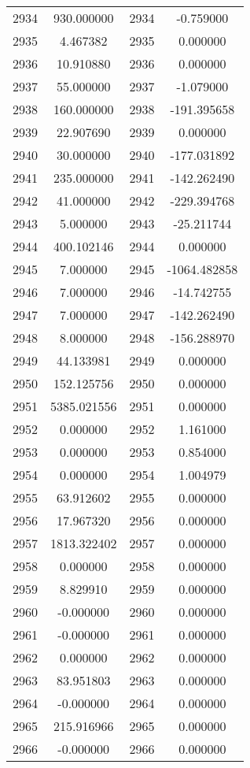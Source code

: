 \documentclass[12pt]{article}
\begin{document}
\begin{longtable}{@{}cccc@{}}
2934 & 930.000000 & 2934 & -0.759000 \\
2935 & 4.467382 & 2935 & 0.000000 \\
2936 & 10.910880 & 2936 & 0.000000 \\
2937 & 55.000000 & 2937 & -1.079000 \\
2938 & 160.000000 & 2938 & -191.395658 \\
2939 & 22.907690 & 2939 & 0.000000 \\
2940 & 30.000000 & 2940 & -177.031892 \\
2941 & 235.000000 & 2941 & -142.262490 \\
2942 & 41.000000 & 2942 & -229.394768 \\
2943 & 5.000000 & 2943 & -25.211744 \\
2944 & 400.102146 & 2944 & 0.000000 \\
2945 & 7.000000 & 2945 & -1064.482858 \\
2946 & 7.000000 & 2946 & -14.742755 \\
2947 & 7.000000 & 2947 & -142.262490 \\
2948 & 8.000000 & 2948 & -156.288970 \\
2949 & 44.133981 & 2949 & 0.000000 \\
2950 & 152.125756 & 2950 & 0.000000 \\
2951 & 5385.021556 & 2951 & 0.000000 \\
2952 & 0.000000 & 2952 & 1.161000 \\
2953 & 0.000000 & 2953 & 0.854000 \\
2954 & 0.000000 & 2954 & 1.004979 \\
2955 & 63.912602 & 2955 & 0.000000 \\
2956 & 17.967320 & 2956 & 0.000000 \\
2957 & 1813.322402 & 2957 & 0.000000 \\
2958 & 0.000000 & 2958 & 0.000000 \\
2959 & 8.829910 & 2959 & 0.000000 \\
2960 & -0.000000 & 2960 & 0.000000 \\
2961 & -0.000000 & 2961 & 0.000000 \\
2962 & 0.000000 & 2962 & 0.000000 \\
2963 & 83.951803 & 2963 & 0.000000 \\
2964 & -0.000000 & 2964 & 0.000000 \\
2965 & 215.916966 & 2965 & 0.000000 \\
2966 & -0.000000 & 2966 & 0.000000 \\

\end{longtable}
\end{document}
